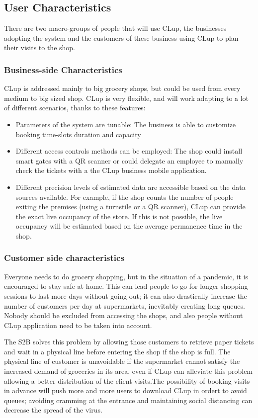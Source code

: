 \subsection{User Characteristics}
There are two macro-groups of people that will use CLup, the businesses adopting the system and the customers of these
business using CLup to plan their visits to the shop.
\subsubsection{Business-side Characteristics}
CLup is addressed mainly to big grocery shops, but could be used from every medium to big sized shop.
CLup is very flexible, and will work adapting to a lot of different scenarios, thanks to these features:
\begin{itemize}
    \item Parameters of the system are tunable: The business is able to customize booking time-slots duration and capacity
    \item Different access controls methods can be employed: The shop could install smart gates with a QR scanner or could delegate an employee to manually check the tickets with a the CLup business mobile application.
    \item Different precision levels of estimated data are accessible based on the data sources available. For example, if the shop counts the number of people exiting the premises (using a turnstile or a QR scanner), CLup can provide the exact live occupancy of the store. If this is not possible, the live occupancy will be estimated based on the average permanence time in the shop.

\end{itemize}
\subsubsection{Customer side characteristics}
Everyone needs to do grocery shopping, but in the situation of a pandemic, it is encouraged to stay safe at home. This can lead people to go for longer shopping sessions to last more days without going out; it can also drastically increase the number of customers per day at supermarkets, inevitably creating long queues.
Nobody should be excluded from accessing the shops, and also people without CLup application need to be taken into account.


The S2B solves this problem by allowing those customers to retrieve paper tickets and wait in a physical line before entering the shop if the shop is full.
The physical line of customer is unavoidable if the supermarket cannot satisfy the increased demand of groceries in its area, even if CLup can alleviate this problem allowing a better distribution of the client visits.The possibility of booking visits in advance will push more and more users to download CLup in ordert to avoid queues; avoiding cramming at the entrance and maintaining social distancing can decrease the spread of the virus.

